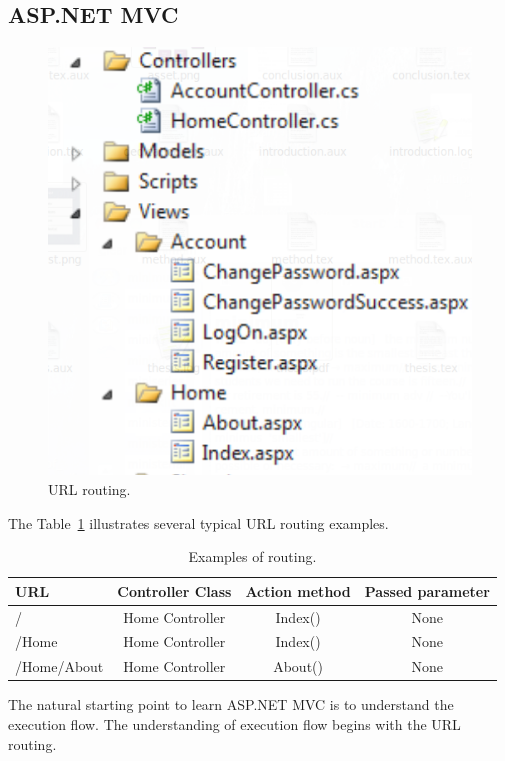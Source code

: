 \subsection{ASP.NET MVC}
\begin{figure}[t]
	\begin{center}
		\includegraphics[scale=0.4]{URLRouting.png}
	\end{center}
	\caption{URL routing.}
\end{figure}
The Table~\ref{tab:routing} illustrates several typical URL routing examples.
\begin{table}[ht]
	\begin{center}
		\begin{tabular}{| l | c | c | c |}
			\hline
			URL & Controller Class & Action method & Passed parameter \\
			\hline
			/ & Home Controller & Index() & None \\
			\hline
			/Home & Home Controller & Index() & None \\
			\hline
			/Home/About & Home Controller & About() & None \\
			\hline
		\end{tabular}
		\caption{Examples of routing.}
		\label{tab:routing}
	\end{center}
\end{table}
The natural starting point to learn ASP.NET MVC is to understand the execution flow. The understanding of execution flow begins with the URL
routing.

